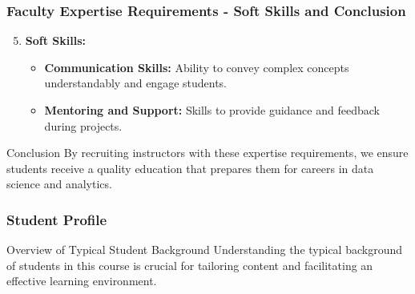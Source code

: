 \documentclass[aspectratio=169]{beamer}
\begin{document}
\begin{frame}[fragile]
  \frametitle{Faculty Expertise Requirements - Soft Skills and Conclusion}
  \begin{enumerate}
    \setcounter{enumi}{4}
    \item \textbf{Soft Skills:}
      \begin{itemize}
        \item \textbf{Communication Skills:} Ability to convey complex concepts understandably and engage students.
        \item \textbf{Mentoring and Support:} Skills to provide guidance and feedback during projects.
      \end{itemize}
  \end{enumerate}

  \begin{block}{Conclusion}
    By recruiting instructors with these expertise requirements, we ensure students receive a quality education that prepares them for careers in data science and analytics.
  \end{block}
\end{frame}

\begin{frame}[fragile]
    \frametitle{Student Profile}
    \begin{block}{Overview of Typical Student Background}
        Understanding the typical background of students in this course is crucial for tailoring content and facilitating an effective learning environment.
    \end{block}
\end{frame}
\end{document}

